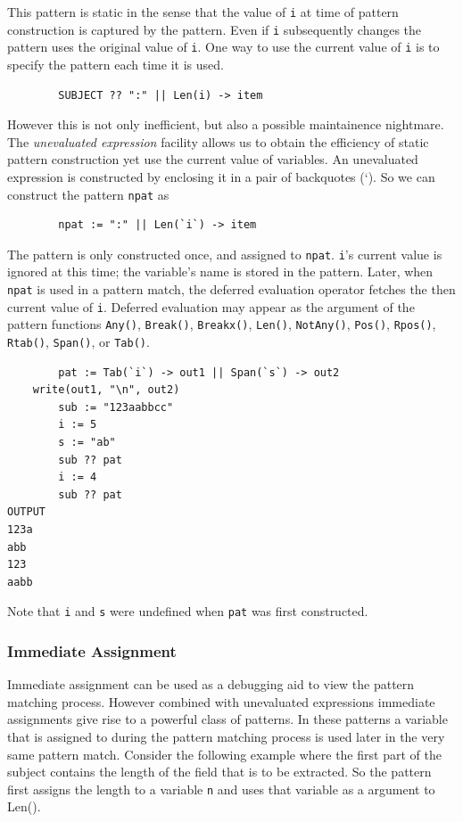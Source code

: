 \documentclass[letterpaper,12pt]{article}
\begin{document}
This pattern is static in the sense that the value of {\tt i} at
time of pattern construction is captured by the pattern. Even if
\texttt{i} subsequently changes the pattern uses the original value of
\texttt{i}. One way to use the current value of \texttt{i} is to
specify the pattern each time it is used.

\begin{verbatim}
        SUBJECT ?? ":" || Len(i) -> item
\end{verbatim}

However this is not only inefficient, but also a possible maintainence
nightmare. The {\em unevaluated expression\/} facility allows us to obtain
the efficiency of static pattern construction yet use the current
value of variables. An unevaluated expression is constructed by
enclosing it in a pair of backquotes (`). So we can construct the pattern
\texttt{npat} as

\begin{verbatim}
        npat := ":" || Len(`i`) -> item
\end{verbatim}

The pattern is only constructed once, and assigned to
\texttt{npat}. \texttt{i}'s current value is ignored at this
time; the variable's name is stored in the pattern.
Later, when \texttt{npat} is used in a pattern match, the
deferred evaluation operator fetches the then current value of
\texttt{i}. Deferred evaluation may appear as the argument of the
pattern functions {\tt Any()}, {\tt Break()}, {\tt Breakx()}, {\tt Len()},
{\tt NotAny()}, {\tt Pos()}, {\tt Rpos()}, {\tt Rtab()}, {\tt Span()},
or {\tt Tab()}.

\begin{verbatim}
        pat := Tab(`i`) -> out1 || Span(`s`) -> out2
	write(out1, "\n", out2)
        sub := "123aabbcc"
        i := 5
        s := "ab"
        sub ?? pat
        i := 4
        sub ?? pat
OUTPUT
123a
abb
123
aabb
\end{verbatim}

Note that \texttt{i} and \texttt{s} were undefined when \texttt{pat}
was first constructed.

\subsubsection{Immediate Assignment}

Immediate assignment can be used as a debugging aid to view the
pattern matching process. However combined with unevaluated
expressions immediate assignments give rise to a powerful class of
patterns. In these patterns a variable that is assigned to during the
pattern matching process is used later in the very same pattern match.
Consider the following example where the first part of the subject
contains the length of the field that is to be extracted. So the
pattern first assigns the length to a variable \texttt{n} and uses
that variable as a argument to Len().
\end{document}
